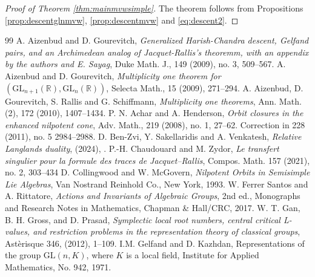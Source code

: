 \documentclass[12pt]{amsart}
\theoremstyle{definition}
\theoremstyle{remark}\newtheorem{rmk}[lm]{Remark}
\newcommand{\GL}{{\mathrm{GL}}}
\newcommand{\R}{\mathbb R}
\begin{document}
    \begin{proof}[Proof of Theorem \ref{thm:mainmvwsimple}]
        The theorem follows from Propositions \ref{prop:descentglnmvw}, \ref{prop:descentmvw} and \eqref{eq:descent2}.
    \end{proof}
	\begin{thebibliography}{99}
		A. Aizenbud and D. Gourevitch, \textit{Generalized Harish-Chandra descent, Gelfand pairs, and an Archimedean analog of Jacquet-Rallis's theoremm, with an appendix by the authors and E. Sayag}, Duke Math. J., 149 (2009), no. 3, 509--567.
        A. Aizenbud and D. Gourevitch, \textit{Multiplicity one theorem for $(\GL_{n+1}(\R),\GL_n(\R))$}, Selecta Math., 15 (2009), 271--294.
        A. Aizenbud, D. Gourevitch, S. Rallis and G. Schiffmann, \textit{Multiplicity one theorems}, Ann. Math. (2), 172 (2010), 1407--1434.  
		P. N. Achar and A. Henderson, \textit{Orbit closures in the enhanced nilpotent
		cone}, Adv. Math., 219 (2008), no. 1, 27--62. Correction in 228 (2011), no. 5 2984–2988.
         D. Ben-Zvi, Y. Sakellaridis and A. Venkatesh, \textit{Relative Langlands duality}, (2024), .
		P.-H. Chaudouard and M. Zydor, \textit{Le transfert singulier pour la formule des traces de Jacquet–Rallis}, Compos. Math. 157 (2021), no. 2, 303--434
		D. Collingwood and W. McGovern, \textit{Nilpotent Orbits in Semisimple Lie Algebras}, Van Nostrand Reinhold Co., New York, 1993.
		W. Ferrer Santos and A. Rittatore, \textit{Actions and Invariants of Algebraic Groups}, 2nd ed., Monographs and
		Research Notes in Mathematics, Chapman \& Hall/CRC, 2017.
        W. T. Gan, B. H. Gross, and D. Prasad, \textit{Symplectic local root numbers, central critical L-values, and restriction problems in the representation theory of classical groups}, Ast\`erisque 346, (2012), 1--109.
        I.M. Gelfand and D. Kazhdan, Representations of the group $\GL(n,K)$, where $K$ is a local field, Institute for Applied Mathematics, No. 942, 1971.

\end{thebibliography}
\end{document}
